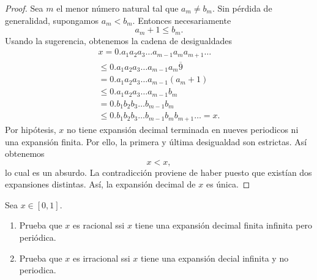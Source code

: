 \documentclass[12pt,a4paper]{article}
\begin{document}
\begin{proof}
        Sea $m$ el menor número natural tal que $a_{m}\neq b_{m}$. Sin pérdida de generalidad,
        supongamos $a_{m}\lt b_{m}$. Entonces necesariamente
        \begin{equation*}
            a_{m}+1\leq b_{m}.
        \end{equation*}
        Usando la sugerencia, obtenemos la cadena de desigualdades
        \begin{gather*}
            x=0.a_{1}a_{2}a_{3}\dots a_{m-1}a_{m}a_{m+1}\dots\\
            \leq 0.a_{1}a_{2}a_{3}\dots a_{m-1}a_{m}\overline{9}\\
            =0.a_{1}a_{2}a_{3}\dots a_{m-1}(a_{m}+1)\\
            \leq0.a_{1}a_{2}a_{3}\dots a_{m-1}b_{m}\\
            =0.b_{1}b_{2}b_{3}\dots b_{m-1}b_{m}\\
            \leq0.b_{1}b_{2}b_{3}\dots b_{m-1}b_{m}b_{m+1}\dots=x.
        \end{gather*}
        Por hipótesis, $x$ no tiene expansión decimal terminada en nueves periodicos ni una expansión
        finita. Por ello, la primera y última desigualdad son estrictas. Así obtenemos
        \begin{equation*}
            x\lt x,
        \end{equation*}
        lo cual es un absurdo. La contradicción proviene de haber puesto que existían dos expansiones
        distintas. Así, la expansión decimal de $x$ es única.
    \end{proof}

    \begin{mdframed}[style=mdpinkbox,frametitle={Ejercicio 4}]
        Sea $x\in[0,1]$.
        \begin{enumerate}
            \item[(a)] Prueba que $x$ es racional ssi $x$ tiene una expansión decimal finita
            infinita pero periódica.
            \item[(b)] Prueba que $x$ es irracional ssi $x$ tiene una expansión decial infinita
            y no periodica.
        \end{enumerate}
    \end{mdframed}
\end{document}

